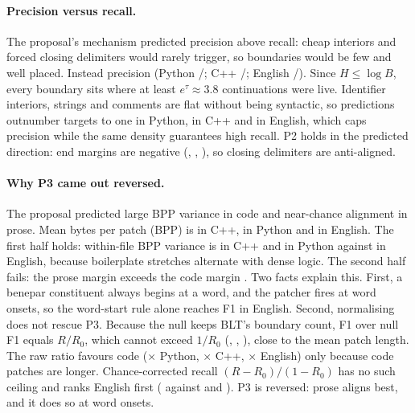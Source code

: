 \paragraph{Precision versus recall.} The proposal's mechanism predicted precision above recall: cheap interiors and forced closing delimiters would rarely trigger, so boundaries would be few and well placed. Instead precision \PrecRecAll{} (Python \PrecPy{}/\RecPy{}; C++ \PrecCpp{}/\RecCpp{}; English \PrecEn{}/\RecEn{}). Since $H\le\log B$, every boundary sits where at least $e^{\tau}\approx3.8$ continuations were live. Identifier interiors, strings and comments are flat without being syntactic, so predictions outnumber targets \xPredPerTargetPy{} to one in Python, \xPredPerTargetCpp{} in C++ and \xPredPerTargetEn{} in English, which caps precision while the same density guarantees high recall. P2 holds in the predicted direction: end margins are negative (\EndMarginPy{}, \EndMarginCpp{}, \EndMarginEn{}), so closing delimiters are anti-aligned.
\TableBaselines

\paragraph{Why P3 came out reversed.} The proposal predicted large BPP variance in code and near-chance alignment in prose. Mean bytes per patch (BPP) is \BppCpp{} in C++, \BppPy{} in Python and \BppEn{} in English. The first half holds: within-file BPP variance is \BppVarCpp{} in C++ and \BppVarPy{} in Python against \BppVarEn{} in English, because boilerplate stretches alternate with dense logic. The second half fails: the prose margin \MarginProse{} exceeds the code margin \MarginCode{}. Two facts explain this. First, a benepar constituent always begins at a word, and the patcher fires at word onsets, so the word-start rule alone reaches F1 \StrongestFoneEn{} in English. Second, normalising does not rescue P3. Because the null keeps BLT's boundary count, F1 over null F1 equals $R/R_0$, which cannot exceed $1/R_0$ (\xRatioCapPy{}, \xRatioCapCpp{}, \xRatioCapEn{}), close to the mean patch length. The raw ratio favours code (\xRatioPy{}$\times$ Python, \xRatioCpp{}$\times$ C++, \xRatioEn{}$\times$ English) only because code patches are longer. Chance-corrected recall $(R-R_0)/(1-R_0)$ has no such ceiling and ranks English first (\xKappaEn{} against \xKappaPy{} and \xKappaCpp{}). P3 is reversed: prose aligns best, and it does so at word onsets.

